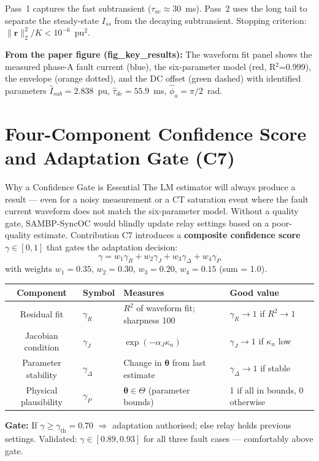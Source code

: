 \documentclass[12pt,a4paper]{article}
\begin{document}
Pass~1 captures the fast subtransient ($\tau_{ac} \approx 30$~ms). Pass~2 uses the long tail to separate the steady-state $I_{ss}$ from the decaying subtransient. Stopping criterion: $\|\mathbf{r}\|_2^2/K < 10^{-6}$~pu$^2$.

\textbf{From the paper figure (fig\_key\_results):} The waveform fit panel shows the measured phase-A fault current (blue), the six-parameter model (red, R$^2$=0.999), the envelope (orange dotted), and the DC offset (green dashed) with identified parameters $\hat{I}_{sub} = 2.838$~pu, $\hat{\tau}_{dc} = 55.9$~ms, $\hat{\phi}_a = \pi/2$~rad.

\section{Four-Component Confidence Score and Adaptation Gate (C7)}

\begin{archbox}{Why a Confidence Gate is Essential}
The LM estimator will always produce a result --- even for a noisy measurement or a CT saturation event where the fault current waveform does not match the six-parameter model. Without a quality gate, SAMBP-SyncOC would blindly update relay settings based on a poor-quality estimate. Contribution C7 introduces a \textbf{composite confidence score} $\gamma \in [0, 1]$ that gates the adaptation decision:
\[
  \gamma = w_1 \gamma_R + w_2 \gamma_J + w_3 \gamma_\Delta + w_4 \gamma_P
\]
with weights $w_1 = 0.35$, $w_2 = 0.30$, $w_3 = 0.20$, $w_4 = 0.15$ (sum = 1.0).

\medskip
\begin{tabular}{@{}clll@{}}
\toprule
\textbf{Component} & \textbf{Symbol} & \textbf{Measures} & \textbf{Good value} \\
\midrule
Residual fit & $\gamma_R$ & $R^2$ of waveform fit; sharpness 100 & $\gamma_R \to 1$ if $R^2 \to 1$ \\
Jacobian condition & $\gamma_J$ & $\exp(-\alpha_J \kappa_n)$ & $\gamma_J \to 1$ if $\kappa_n$ low \\
Parameter stability & $\gamma_\Delta$ & Change in $\bm{\theta}$ from last estimate & $\gamma_\Delta \to 1$ if stable \\
Physical plausibility & $\gamma_P$ & $\bm{\theta} \in \Theta$ (parameter bounds) & 1 if all in bounds, 0 otherwise \\
\bottomrule
\end{tabular}

\medskip
\textbf{Gate:} If $\gamma \geq \gamma_\mathrm{th} = 0.70$ $\Rightarrow$ adaptation authorised; else relay holds previous settings. Validated: $\gamma \in [0.89, 0.93]$ for all three fault cases --- comfortably above gate.
\end{archbox}
\end{document}
